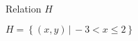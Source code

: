 {
\begin{center}
\\
Relation $H$
\end{center}}
{$H = \left\{ \left(x,y \right) \, | \, -3 < x \leq 2 \right\}$}